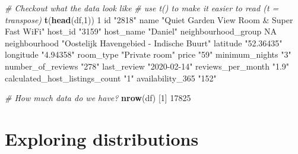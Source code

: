 \documentclass[]{book}
\newenvironment{Shaded}{\begin{snugshade}}{\end{snugshade}}
\newcommand{\CommentTok}[1]{\textcolor[rgb]{0.56,0.35,0.01}{\textit{#1}}}
\newcommand{\DecValTok}[1]{\textcolor[rgb]{0.00,0.00,0.81}{#1}}
\newcommand{\KeywordTok}[1]{\textcolor[rgb]{0.13,0.29,0.53}{\textbf{#1}}}
\newcommand{\NormalTok}[1]{#1}
\newcommand{\OtherTok}[1]{\textcolor[rgb]{0.56,0.35,0.01}{#1}}
\newcommand{\StringTok}[1]{\textcolor[rgb]{0.31,0.60,0.02}{#1}}
\begin{document}
\begin{Shaded}
\begin{Highlighting}[]
\CommentTok{# Checkout what the data look like}
\CommentTok{# use t() to make it easier to read (t = transpose)}
\KeywordTok{t}\NormalTok{(}\KeywordTok{head}\NormalTok{(df,}\DecValTok{1}\NormalTok{))}
                               \DecValTok{1}                                         
\NormalTok{id                             }\StringTok{"2818"}                                    
\NormalTok{name                           }\StringTok{"Quiet Garden View Room & Super Fast WiFi"}
\NormalTok{host_id                        }\StringTok{"3159"}                                    
\NormalTok{host_name                      }\StringTok{"Daniel"}                                  
\NormalTok{neighbourhood_group            }\OtherTok{NA}                                        
\NormalTok{neighbourhood                  }\StringTok{"Oostelijk Havengebied - Indische Buurt"}  
\NormalTok{latitude                       }\StringTok{"52.36435"}                                
\NormalTok{longitude                      }\StringTok{"4.94358"}                                 
\NormalTok{room_type                      }\StringTok{"Private room"}                            
\NormalTok{price                          }\StringTok{"59"}                                      
\NormalTok{minimum_nights                 }\StringTok{"3"}                                       
\NormalTok{number_of_reviews              }\StringTok{"278"}                                     
\NormalTok{last_review                    }\StringTok{"2020-02-14"}                              
\NormalTok{reviews_per_month              }\StringTok{"1.9"}                                     
\NormalTok{calculated_host_listings_count }\StringTok{"1"}                                       
\NormalTok{availability_}\DecValTok{365}               \StringTok{"152"}                                     

\CommentTok{# How much data do we have?}
\KeywordTok{nrow}\NormalTok{(df)}
\NormalTok{[}\DecValTok{1}\NormalTok{] }\DecValTok{17825}
\end{Highlighting}
\end{Shaded}

\hypertarget{exploring-distributions}{%
\section*{Exploring distributions}\label{exploring-distributions}}
\end{document}
